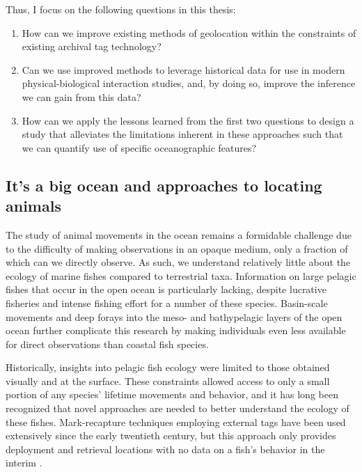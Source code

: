 Thus, I focus on the following questions in this thesis:

\begin{enumerate}
    \item How can we improve existing methods of geolocation within the constraints of existing archival tag technology?
    \item Can we use improved methods to leverage historical data for use in modern physical-biological interaction studies, and, by doing so, improve the inference we can gain from this data?
    \item How can we apply the lessons learned from the first two questions to design a study that alleviates the limitations inherent in these approaches such that we can quantify use of specific oceanographic features?
\end{enumerate}

\subsection{It's a big ocean and approaches to locating animals}
The study of animal movements in the ocean remains a formidable challenge due to the difficulty of making observations in an opaque medium, only a fraction of which can we directly observe. As such, we understand relatively little about the ecology of marine fishes compared to terrestrial taxa. Information on large pelagic fishes that occur in the open ocean is particularly lacking, despite lucrative fisheries and intense fishing effort for a number of these species. Basin-scale movements \citep{Skomal2009} and deep forays into the meso- and bathypelagic layers of the open ocean \citep{Thorrold2014a} further complicate this research by making individuals even less available for direct observations than coastal fish species.

Historically, insights into pelagic fish ecology were limited to those obtained visually and at the surface. These constraints allowed access to only a small portion of any species' lifetime movements and behavior, and it has long been recognized that novel approaches are needed to better understand the ecology of these fishes. Mark-recapture techniques employing external tags have been used extensively since the early twentieth century, but this approach only provides deployment and retrieval locations with no data on a fish's behavior in the interim \citep{Kohler2001}.

